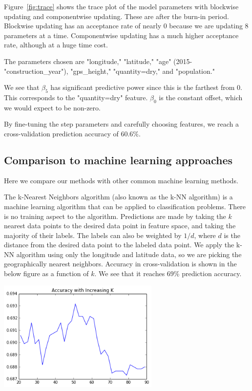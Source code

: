 \documentclass{article} %
\begin{document}
\begin{multicols}{2}
Figure~\ref{fig:trace} shows the trace plot of the model parameters with blockwise updating and componentwise updating. These are after the burn-in period. Blockwise updating has an acceptance rate of nearly 0 because we are updating 8 parameters at a time. Componentwise updating has a much higher acceptance rate, although at a huge time cost.

The parameters chosen are "longitude," "latitude," "age" (2015-"construction\_year"), "gps\_height," "quantity=dry," and "population."

We see that $\beta_5$ has significant predictive power since this is the farthest from 0. This corresponds to the "quantity=dry" feature. $\beta_0$ is the constant offset, which we would expect to be non-zero. 

By fine-tuning the step parameters and carefully choosing features, we reach a cross-validation prediction accuracy of 60.6\%.

\subsection{Comparison to machine learning approaches}

Here we compare our methods with other common machine learning methods.

The k-Nearest Neighbors algorithm (also known as the k-NN algorithm) is a machine learning algorithm that can be applied to classification problems. There is no training aspect to the algorithm. Predictions are made by taking the $k$ nearest data points to the desired data point in feature space, and taking the majority of their labels. The labels can also be weighted by $1/d$, where $d$ is the distance from the desired data point to the labeled data point. We apply the k-NN algorithm using only the longitude and latitude data, so we are picking the geographically nearest neighbors. Accuracy in cross-validation is shown in the below figure as a function of $k$. We see that it reaches 69\% prediction accuracy.

\includegraphics[width=8cm]{figures/kNN_accuracy_vs_K.png}


\end{multicols}
\end{document}
